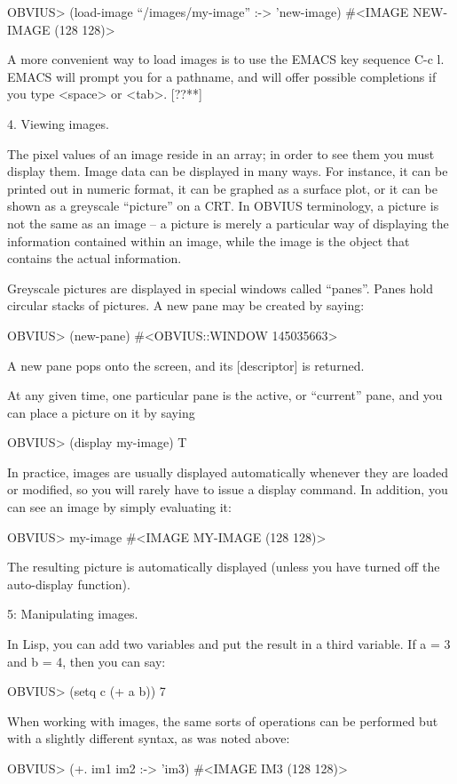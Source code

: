 OBVIUS> (load-image ``/images/my-image'' :-> 'new-image)
#<IMAGE NEW-IMAGE (128 128)>

A more convenient way to load images is to use the EMACS key sequence
C-c l.  EMACS will prompt you for a pathname, and will offer possible
completions if you type <space> or <tab>. [??**]



4. Viewing images.

The pixel values of an image reside in an array; in order to see them
you must display them.  Image data can be displayed in many ways.  For
instance, it can be printed out in numeric format, it can be graphed
as a surface plot, or it can be shown as a greyscale ``picture'' on a
CRT.  In OBVIUS terminology, a picture is not the same as an image --
a picture is merely a particular way of displaying the information contained
within an image, while the image is the object that contains the 
actual information.

Greyscale pictures are displayed in special windows called ``panes''.
Panes hold circular stacks of pictures.  A new pane may be created by saying:

OBVIUS> (new-pane)
#<OBVIUS::WINDOW 145035663>

A new pane pops onto the screen, and its [descriptor] is returned.

At any given time, one particular pane is the active, or ``current'' pane, and
you can place a picture on it by saying

OBVIUS> (display my-image)
T

In practice, images are usually displayed automatically whenever they
are loaded or modified, so you will rarely have to issue a display command.
In addition, you can see an image by simply evaluating it:

OBVIUS> my-image
#<IMAGE MY-IMAGE (128 128)>

The resulting picture is automatically displayed (unless you have
turned off the auto-display function).


5: Manipulating images.

In Lisp, you can add two variables and put the result in a third
variable.  If a = 3 and b = 4, then you can say:

OBVIUS> (setq c (+ a b))
7

When working with images, the same sorts of operations can be performed
but with a slightly different syntax, as was noted above:

OBVIUS> (+. im1 im2 :-> 'im3)
#<IMAGE IM3 (128 128)>

